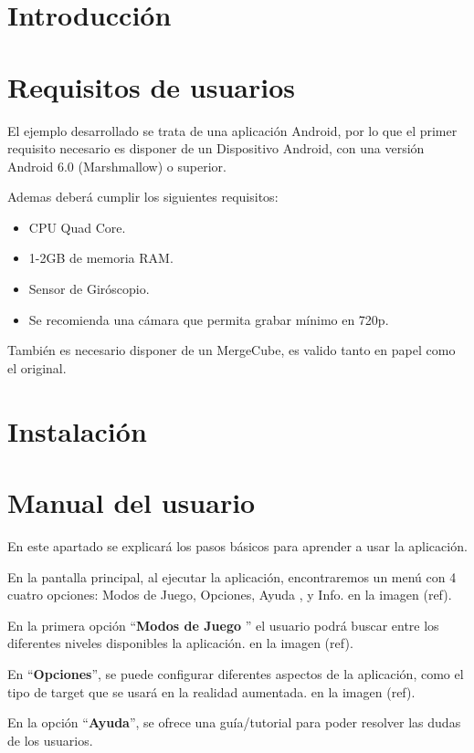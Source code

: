 
\section{Introducción}

\section{Requisitos de usuarios}
 El ejemplo desarrollado se trata de una aplicación Android, por lo que el primer requisito necesario es disponer de un Dispositivo Android, con una versión Android 6.0 (Marshmallow) o superior.
  
 Ademas deberá cumplir los siguientes requisitos\cite{vuforia_devices}:
 \begin{itemize}
 	\item CPU Quad Core.
 	\item 1-2GB de memoria RAM.
 	\item Sensor de Giróscopio.
 	\item Se recomienda una cámara que permita grabar mínimo en 720p.  
 \end{itemize}
También es necesario disponer de un MergeCube, es valido tanto en papel como el original. 
\section{Instalación}

\section{Manual del usuario}

En este apartado se explicará los pasos básicos para aprender a usar la aplicación.

En la pantalla principal, al ejecutar la aplicación, encontraremos un menú con 4 cuatro opciones: Modos de Juego, Opciones, Ayuda , y Info. en la imagen (ref).

En la primera opción ``\textbf{Modos de Juego} '' el usuario podrá buscar entre los diferentes niveles disponibles la aplicación. en la imagen (ref).

En ``\textbf{Opciones}'', se puede configurar diferentes aspectos de la aplicación, como el tipo de target que se usará en la realidad aumentada. en la imagen (ref).

En la opción ``\textbf{Ayuda}'', se ofrece una guía/tutorial para poder resolver las dudas de los usuarios.

